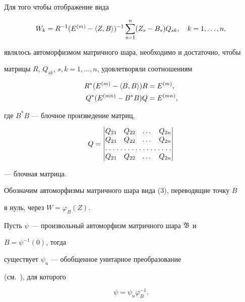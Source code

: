 \begin{thm} 


Для того чтобы отображение вида 


\begin{equation} 


W_k=R^{-1}(E^{(m)}-\la Z,B\ra)^{-1} 


\sum^n_{s=1}(Z_s-B_s)Q_{sk},\quad k=1,\dotsc,n,


\end{equation} 


являлось автоморфизмом матричного шара, необходимо и достаточно, чтобы 


матрицы $R$, $Q_{sk}$, $s,k=1,\dotsc,n$, удовлетворяли соотношениям 


\begin{align*} 


R^*(E^{(m)}-\la B,B\ra)R&=E^{(m)},\\ 


Q^*(E^{(mn)}-B^*B)Q&=E^{(mn)}, 


\end{align*} 


где $B^*B$ --- блочное произведение матриц, 


$$ 


Q= 


\begin{vmatrix} 


Q_{21} & Q_{22} & \dots & Q_{2n} \\ 


Q_{21} & Q_{22} & \dots & Q_{2n} \\ 


\hdotsfor[1.5]{4} \\


Q_{21} & Q_{22} & \dots & Q_{2n} 


\end{vmatrix} 


$$ 


--- блочная матрица. 


\end{thm} 





Обозначим автоморфизмы матричного шара вида (3), переводящие точку $B$ 


в нуль, через $W=\varphi_B(Z)$. 


 


\begin{cor} 


Пусть $\psi$ --- произвольный автоморфизм матричного шара $\frak B$ и 


$B=\psi^{-1}(0)$, тогда 


существует $\psi_u$ --- обобщенное унитарное преобразование 


(см.~\cite{4}), для которого 


$$ 


\psi=\psi_u\varphi^{-1}_B. 


$$ 


\end{cor} 


